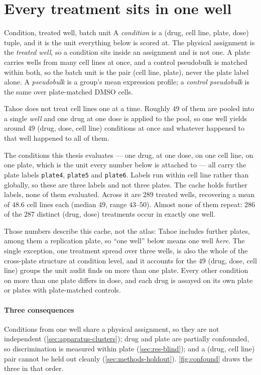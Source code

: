\section{Every treatment sits in one well}
\begin{defn}{Condition, treated well, batch unit}
  A \emph{condition} is a (drug, cell line, plate, dose) tuple, and it is the unit
  everything below is scored at. The physical assignment is the \emph{treated
  well}, so a condition sits inside an assignment and is not one. A plate carries wells from many cell lines at once, and a control pseudobulk is
  matched within both, so the batch unit is the pair (cell line, plate), never the
  plate label alone. A \emph{pseudobulk} is a group's mean
  expression profile; a \emph{control pseudobulk} is the same over plate-matched
  DMSO cells.
  \end{defn}

Tahoe does not treat cell lines one at a time. Roughly $49$ of them are pooled
into a single \emph{well} and one drug at one dose is applied to the pool, so
one well yields around $49$ (drug, dose, cell line) conditions at once and
whatever happened to that well happened to all of them.

The conditions this thesis evaluates --- one drug, at one dose, on one cell
line, on one plate, which is the unit every number below is attached to ---
all carry the plate labels \texttt{plate4}, \texttt{plate5} and \texttt{plate6}.
Labels run within cell line rather than globally, so these are three labels and
not three plates. The cache holds further labels, none of them evaluated.
Across it are $289$ treated wells, recovering a mean of $48.6$ cell lines each
(median $49$, range $43$--$50$). Almost none of them repeat: $286$ of the $287$
distinct (drug, dose) treatments occur in exactly one well.

Those numbers describe this cache, not the atlas: Tahoe includes further plates,
among them a replication plate, so ``one well'' below means one well
\emph{here}. The single exception, one treatment spread over three wells, is
also the whole of the cross-plate structure at condition level, and it accounts
for the $49$ (drug, dose, cell line) groups the unit audit finds on more than
one plate. Every other condition on more than one plate differs in dose, and
each drug is assayed on its own plate or plates with plate-matched controls.

\paragraph{Three consequences} Conditions from one well share a physical
assignment, so they are not independent (\cref{sec:apparatus-clusters}); drug
and plate are partially confounded, so discrimination is measured within plate
(\cref{sec:res-blind}); and a (drug, cell line) pair cannot be held out cleanly
(\cref{sec:methods-holdout}). \cref{fig:confound} draws the three in that
order.

